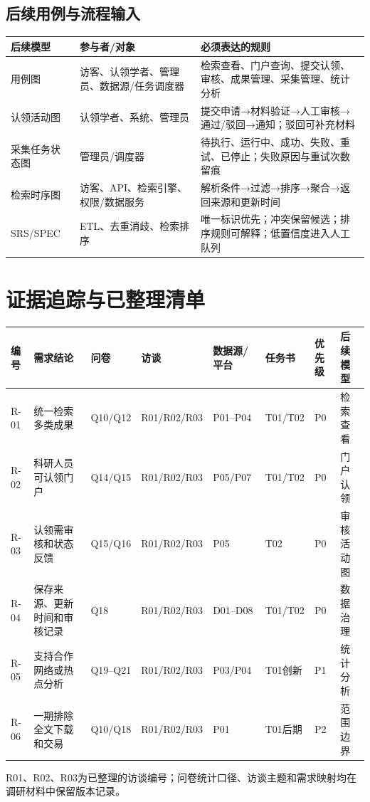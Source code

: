 \documentclass[UTF8,11pt,a4paper]{ctexart}
\begin{document}
\subsection{后续用例与流程输入}
\begin{longtable}{p{2.7cm}p{4.3cm}p{7.0cm}}
\toprule 后续模型 & 参与者/对象 & 必须表达的规则\\\midrule
用例图 & 访客、认领学者、管理员、数据源/任务调度器 & 检索查看、门户查询、提交认领、审核、成果管理、采集管理、统计分析\\
认领活动图 & 认领学者、系统、管理员 & 提交申请→材料验证→人工审核→通过/驳回→通知；驳回可补充材料\\
采集任务状态图 & 管理员/调度器 & 待执行、运行中、成功、失败、重试、已停止；失败原因与重试次数留痕\\
检索时序图 & 访客、API、检索引擎、权限/数据服务 & 解析条件→过滤→排序→聚合→返回来源和更新时间\\
SRS/SPEC & ETL、去重消歧、检索排序 & 唯一标识优先；冲突保留候选；排序规则可解释；低置信度进入人工队列\\\bottomrule
\end{longtable}

\section{证据追踪与已整理清单}
\begin{longtable}{p{1.1cm}p{4.0cm}p{1.8cm}p{1.7cm}p{2.4cm}p{1.7cm}p{1.0cm}p{2.0cm}}
\toprule 编号 & 需求结论 & 问卷 & 访谈 & 数据源/平台 & 任务书 & 优先级 & 后续模型\\\midrule
R-01 & 统一检索多类成果 & Q10/Q12 & R01/R02/R03 & P01--P04 & T01/T02 & P0 & 检索查看\\
R-02 & 科研人员可认领门户 & Q14/Q15 & R01/R02/R03 & P05/P07 & T01/T02 & P0 & 门户认领\\
R-03 & 认领需审核和状态反馈 & Q15/Q16 & R01/R02/R03 & P05 & T02 & P0 & 审核活动图\\
R-04 & 保存来源、更新时间和审核记录 & Q18 & R01/R02/R03 & D01--D08 & T01/T02 & P0 & 数据治理\\
R-05 & 支持合作网络或热点分析 & Q19--Q21 & R01/R02/R03 & P03/P04 & T01创新 & P1 & 统计分析\\
R-06 & 一期排除全文下载和交易 & Q10/Q18 & R01/R02/R03 & P01 & T01后期 & P2 & 范围边界\\\bottomrule
\end{longtable}
R01、R02、R03为已整理的访谈编号；问卷统计口径、访谈主题和需求映射均在调研材料中保留版本记录。
\end{document}
